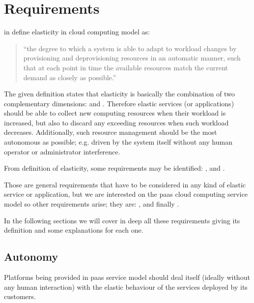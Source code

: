 %
%
\section{Requirements}
\label{sec:elasticity-requirements}
\citeauthor{herbst2013elasticity} in \cite{herbst2013elasticity} define elasticity in cloud computing
model as:

\begin{quote}
	``the degree to which a system is able to adapt to workload changes by provisioning and
	deprovisioning resources in an automatic manner, such that at each point in time the available resources
	match the current demand as closely as possible.''
\end{quote}

The given definition states that elasticity is basically the combination of two complementary
dimensions:  and . Therefore elastic services (or applications)
should be able to collect new computing resources when their workload is increased, but also to discard
any exceeding resources when such workload decreases. Additionally, such resource management should be
the most autonomous as possible; e.g. driven by the system itself without any human operator or
administrator interference.

From \citeauthor{herbst2013elasticity} definition of elasticity, some requirements may be
identified: ,  and .

Those are general requirements that have to be considered in any kind of elastic service or application,
but we are interested on the \ac{paas} cloud computing service model so other requirements arise;
they are: ,  and finally .

In the following sections we will cover in deep all these requirements giving its definition and
some explanations for each one.

\subsection{Autonomy}
\label{sec:elasticity-requirements-autonomy}
Platforms being provided in \ac{paas} service model should deal itself (ideally without any human
interaction) with the elastic behaviour of the services deployed by its customers.


